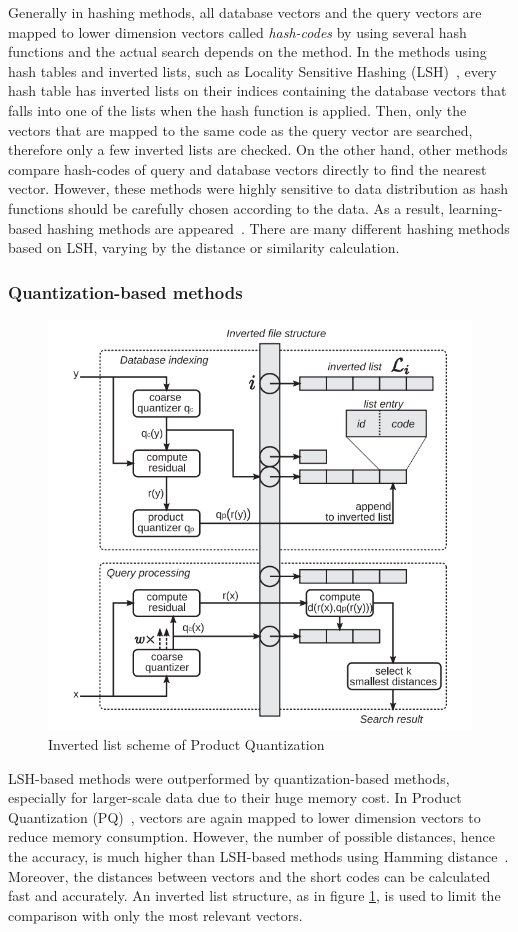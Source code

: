 Generally in hashing methods, all database vectors and the query vectors are mapped to lower dimension vectors called \emph{hash-codes} by using several hash functions and the actual search depends on the method. 
In the methods using hash tables and inverted lists, such as Locality Sensitive Hashing (LSH)~\cite{indyk1998approximate}, every hash table has inverted lists on their indices containing the database vectors that falls into one of the lists when the hash function is applied.
Then, only the vectors that are mapped to the same code as the query vector are searched, therefore only a few inverted lists are checked.
On the other hand, other methods compare hash-codes of query and database vectors directly to find the nearest vector.
However, these methods were highly sensitive to data distribution as hash functions should be carefully chosen according to the data. 
As a result, learning-based hashing methods are appeared~\cite{weiss2009spectral}\cite{liu2012supervised}.
There are many different hashing methods based on LSH, varying by the distance or similarity calculation.

\subsubsection*{Quantization-based methods}
\label{subsec:related-quantization}

\begin{figure}
    \centering
    \includegraphics[width=.6\textwidth]{thesis/images/pq-fig.png}
    \caption{Inverted list scheme of Product Quantization\cite{jegou2010product}}
    \label{fig:pq}
\end{figure}

LSH-based methods were outperformed by quantization-based methods, especially for larger-scale data due to their huge memory cost.
In Product Quantization (PQ)~\cite{jegou2010product}, vectors are again mapped to lower dimension vectors to reduce memory consumption. 
However, the number of possible distances, hence the accuracy, is much higher than LSH-based methods using Hamming distance~\cite{weiss2009spectral}.
Moreover, the distances between vectors and the short codes can be calculated fast and accurately.
An inverted list structure, as in figure \ref{fig:pq}, is used to limit the comparison with only the most relevant vectors.

